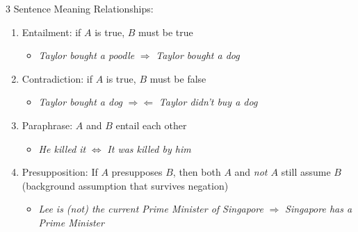 \documentclass[12pt, a4paper]{article}
\begin{document}
\begin{multicols*}{3}
Sentence Meaning Relationships:
\begin{enumerate}[\roman*.]
  \item Entailment: if $A$ is true, $B$ must be true
    \begin{itemize}[leftmargin=*]\vspace{3pt}
      \item \textit{Taylor bought a poodle} $\Rightarrow$ \textit{Taylor bought a dog}
    \end{itemize}
  \item Contradiction: if $A$ is true, $B$ must be false
    \begin{itemize}[leftmargin=*]\vspace{3pt}
      \item  \textit{Taylor bought a dog} $\Rightarrow\Leftarrow$ \textit{Taylor didn't buy a dog}
    \end{itemize}
  \item Paraphrase: $A$ and $B$ entail each other
    \begin{itemize}[leftmargin=*]\vspace{3pt}
      \item  \textit{He killed it} $\Leftrightarrow$ \textit{It was killed by him}
    \end{itemize}
  \item Presupposition: If $A$ presupposes $B$, then both $A$ and \textit{not $A$} still assume $B$\\(background assumption that survives negation)
    \begin{itemize}[leftmargin=*]\vspace{3pt}
      \item  \textit{Lee is (not) the current Prime Minister of Singapore} $\Rightarrow$ \textit{Singapore has a Prime Minister}
    \end{itemize}
\end{enumerate}


\end{multicols*}
\end{document}
